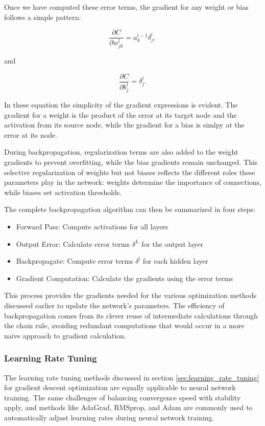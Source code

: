 \documentclass[aps,pra,english,notitlepage,reprint,nofootinbib]{revtex4-1}  %
\begin{document}
Once we have computed these error terms, the gradient for any weight or bias follows a simple pattern:

\begin{equation}
    \frac{\partial C}{\partial w_{jk}^l} = a_k^{l-1}\delta_j^l,
\end{equation}

and

\begin{equation}
    \frac{\partial C}{\partial b_j^l} = \delta_j^l.
\end{equation}

In these equation the simplicity of the gradient expressions is evident. The gradient for a weight is the product of the error at its target node and the activation from its source node, while the gradient for a bias is simlpy at the error at its node.

During backpropagation, regularization terms are also added to the weight gradients to prevent overfitting, while the bias gradients remain unchanged. This selective regularization of weights but not biases reflects the different roles these parameters play in the network: weights determine the importance of connections, while biases set activation thresholds.

The complete backpropagation algorithm can then be summarized in four steps:

\begin{itemize}
    \item Forward Pass: Compute activations for all layers
    \item Output Error: Calculate error terms \( \delta^L \) for the output layer
    \item Backpropagate: Compute error terms \( \delta^l \) for each hidden layer
    \item Gradient Computation: Calculate the gradients using the error terms
\end{itemize}

This process provides the gradients needed for the various optimization methods discussed earlier to update the network's parameters. The efficiency of backpropagation comes from its clever reuse of intermediate calculations through the chain rule, avoiding redundant computations that would occur in a more naive approach to gradient calculation.

\subsubsection{Learning Rate Tuning}
The learning rate tuning methods discussed in section \ref{sec:learning_rate_tuning} for gradient descent optimization are equally applicable to neural network training. The same challenges of balancing convergence speed with stability apply, and methods like AdaGrad, RMSprop, and Adam are commonly used to automatically adjust learning rates during neural network training.
\end{document}
